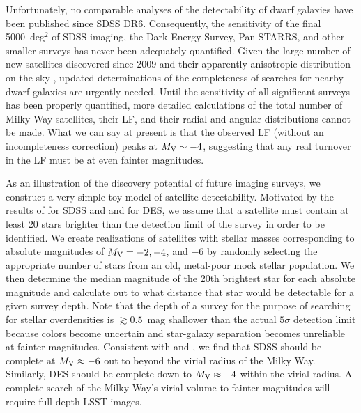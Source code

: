 \documentclass[a4paper]{ar-1col}
\begin{document}
Unfortunately, no comparable analyses of the detectability of dwarf
galaxies have been published since SDSS DR6.  Consequently, the
sensitivity of the final 5000~deg$^{2}$ of SDSS imaging, the Dark
Energy Survey, Pan-STARRS, and other smaller surveys has never been
adequately quantified.  Given the large number of new satellites
discovered since 2009 and their apparently anisotropic distribution on
the sky \citep{drlica15}, updated determinations of the completeness
of searches for nearby dwarf galaxies are urgently needed.  Until the
sensitivity of all significant surveys has been properly quantified,
more detailed calculations of the total number of Milky Way
satellites, their LF, and their radial and angular distributions
cannot be made.  What we can say at present is that the observed LF
(without an incompleteness correction) peaks at $M_{{\rm V}} \sim -4$,
suggesting that any real turnover in the LF must be at even fainter
magnitudes.

As an illustration of the discovery potential of future imaging
surveys, we construct a very simple toy model of satellite
detectability.  Motivated by the results of \citet{martin08} for SDSS
and \citet{bechtol15} and \citet{drlica15} for DES, we assume that a
satellite must contain at least 20 stars brighter than the detection
limit of the survey in order to be identified.  We create realizations
of satellites with stellar masses corresponding to absolute magnitudes
of $M_{{\rm V}} = -2, -4$, and $-6$ by randomly selecting the
appropriate number of stars from an old, metal-poor mock stellar
population.  We then determine the median magnitude of the 20th
brightest star for each absolute magnitude and calculate out to what
distance that star would be detectable for a given survey depth.  Note
that the depth of a survey for the purpose of searching for stellar
overdensities is $\gtrsim0.5$~mag shallower than the actual $5\sigma$
detection limit because colors become uncertain and star-galaxy
separation becomes unreliable at fainter magnitudes.  Consistent with
\citet{koposov08} and \citet{walsh09}, we find that SDSS should be
complete at $M_{{\rm V}} \approx -6$ out to beyond the virial radius
of the Milky Way.  Similarly, DES should be complete down to $M_{{\rm
    V}} \approx -4$ within the virial radius.  A complete search of
the Milky Way's virial volume to fainter magnitudes will require
full-depth LSST images.
\end{document}
